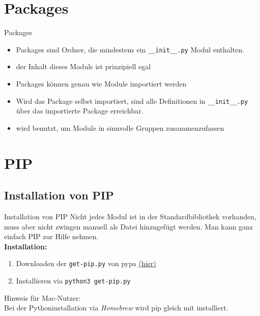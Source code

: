 
\section{Packages}
\begin{frame}{Packages}
	\begin{itemize}
		\item Packages sind Ordner, die mindestens ein \texttt{\_\_init\_\_.py} Modul enthalten.
		\item der Inhalt dieses Moduls ist prinzipiell egal
		\item Packages k\"onnen genau wie Module importiert werden
		\item Wird das Package selbst importiert, sind alle Definitionen in \texttt{\_\_init\_\_.py} \"uber das importierte Package erreichbar.
		\item wird benutzt, um Module in sinnvolle Gruppen zusammenzufassen
	\end{itemize}
\end{frame}


\section{PIP}
\subsection{Installation von PIP}
\begin{frame}{Installation von PIP}
	Nicht jedes Modul ist in der Standardbibliothek vorhanden, muss aber nicht zwingen manuell als Datei hinzugef\"ugt werden. Man kann ganz einfach PIP zur Hilfe nehmen.\\[.5cm]
	\textbf{Installation:}\\
	\begin{enumerate}
		\item Downloaden der \texttt{get-pip.py} von pypa \href{https://bootstrap.pypa.io/get-pip.py}{(hier)}
		\item Installieren via \texttt{python3 get-pip.py}\\[.5cm]
	\end{enumerate}

	Hinweis f\"ur Mac-Nutzer:\\
	Bei der Pythoninstallation via \textit{Homebrew} wird pip gleich mit installiert.
\end{frame}



